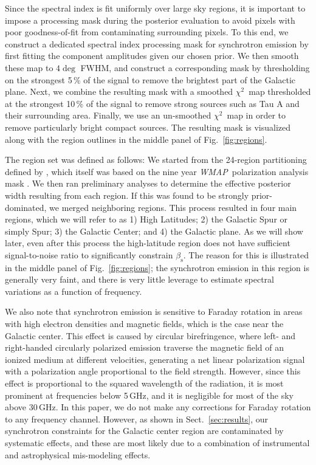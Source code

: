 \documentclass[twocolumn]{aa}
\def\WMAP{\textit{WMAP}}
\def\chisq{$\chi^2$}
\newcommand{\?}[1]{\textcolor{red}{{\bf [#1]}}}
\begin{document}
Since the spectral index is fit uniformly over large sky regions, it is
important to impose a processing mask during the posterior evaluation to avoid
pixels with poor goodness-of-fit from contaminating surrounding pixels. To this
end, we construct a dedicated spectral index processing mask for synchrotron
emission by first fitting the component amplitudes given our chosen prior. We
then smooth these map to $4\deg$ FWHM, and construct a corresponding mask by
thresholding on the strongest 5\,\% of the signal to remove the brightest part
of the Galactic plane. Next, we combine the resulting mask with a smoothed
\chisq\ map thresholded at the strongest 10\,\% of the signal to remove strong
sources such as Tau A and their surrounding area.  Finally, we use an
un-smoothed \chisq\ map in order to remove particularly bright compact sources.
The resulting mask is visualized along with the region outlines in the middle
panel of Fig.~\ref{fig:regions}.

The region set was defined as follows: We started from the 24-region
partitioning defined by \citet{fuskeland2014}, which itself was based
on the nine year \WMAP\ polarization analysis mask
\citep{bennett2012}. We then ran preliminary analyses to determine the
effective posterior width resulting from each region. If this was
found to be strongly prior-dominated, we merged neighboring
regions. This process resulted in four main regions, which we will
refer to as 1) High Latitudes; 2) the Galactic Spur or simply Spur; 3)
the Galactic Center; and 4) the Galactic plane. As we will show later,
even after this process the high-latitude region does not have
sufficient signal-to-noise ratio to significantly constrain
$\beta_{\mathrm s}$. The reason for this is illustrated in the middle
panel of Fig.~\ref{fig:regions}; the synchrotron emission in this
region is generally very faint, and there is very little leverage to
estimate spectral variations as a function of frequency.

We also note that synchrotron emission is sensitive to Faraday
rotation \citep[e.g.,][]{beck:2013} in areas with high electron
densities and magnetic fields, which is the case near the Galactic
center. This effect is caused by circular birefringence, where left-
and right-handed circularly polarized emission traverse the magnetic
field of an ionized medium at different velocities, generating a net
linear polarization signal with a polarization angle proportional to
the field strength. However, since this effect is proportional to the
squared wavelength of the radiation, it is most prominent at
frequencies below 5\,GHz, and it is negligible for most of the sky
above 30\,GHz. In this paper, we do not make any corrections for
Faraday rotation to any frequency channel. However, as shown in
Sect.~\ref{sec:results}, our synchrotron constraints for the Galactic
center region are contaminated by systematic effects, and
these are most likely due to a combination of instrumental and
astrophysical mis-modeling effects.
\end{document}
